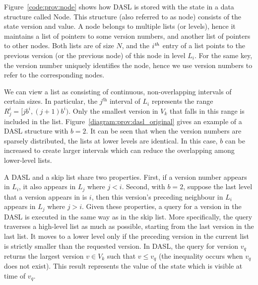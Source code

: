 Figure~\ref{code:prov:node} shows how DASL is stored with the state in a data structure called Node.  This structure
(also referred to as node) consists of the state version and value. A node belongs to multiple lists (or
levels), hence it maintains  a list of pointers to some version numbers, and another list of pointers to other
nodes.  Both lists are of size $N$, and the $i^{\textit th}$ entry of a list points to the previous version
(or the previous node) of this node in level $L_i$.  For the same key, the version number uniquely identifies
the node, hence we use version numbers to refer to the corresponding nodes.

We can view a list as consisting of continuous, non-overlapping intervals of certain sizes. In particular, the
$j^{\textit{th}}$ interval of $L_i$ represents the range $R^i_j = [jb^i, (j+1)b^i)$. Only the smallest version in $V_k$ that
falls in this range is included in the list. Figure~\ref{diagram:prov:dasl_original} gives an example of a DASL
structure with $b=2$. It can be seen that when the version numbers are sparsely distributed, the lists at lower levels are
identical. In this case, $b$ can be increased to create larger intervals which can reduce the overlapping among
lower-level lists.   

A DASL and a skip list share two properties. First, if a version number appears in $L_i$, it also appears in
$L_j$ where $j<i$.  Second, with $b=2$, suppose the last level that a version appears in is $i$, then this
version's preceding neighbour in $L_i$ appears in $L_j$ where $j>i$. 
Given these properties,
a query for a version in the DASL is executed in the same way as in the skip list.
More specifically, the query traverses a high-level list as much as possible, starting from
the last version in the last list. It moves to a lower level only if the preceding version in the current list
is strictly smaller than the requested version. In DASL, the query for version $v_q$ returns the largest
version $v \in V_k$ such that $v \leq v_q$ (the inequality occurs when $v_q$ does not exist). This result
represents the value of the state which is visible at time of $v_q$. 

